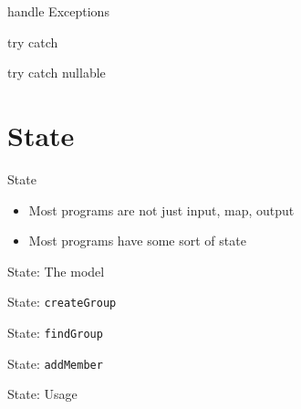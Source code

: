 \documentclass[aspectratio=169,notes]{beamer}
\begin{document}
	\begin{frame}[fragile]{handle Exceptions}
		
	\end{frame}

	\begin{frame}[fragile]{try catch}
		
	\end{frame}

	\begin{frame}[fragile]{try catch nullable}
		
	\end{frame}

	\section{State}

	\begin{frame}[fragile]{State}
		\begin{itemize}
			\item Most programs are not just input, map, output
			\item Most programs have some sort of state
		\end{itemize}
	\end{frame}

	\begin{frame}[fragile]{State: The model}
		
	\end{frame}

	\begin{frame}[fragile]{State: \lstinline{createGroup}}
		
	\end{frame}

	\begin{frame}[fragile]{State: \lstinline{findGroup}}
		
	\end{frame}

	\begin{frame}[fragile]{State: \lstinline{addMember}}
		
	\end{frame}

	\begin{frame}[fragile]{State: Usage}
		
	\end{frame}
\end{document}
